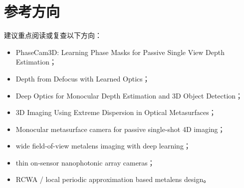 \documentclass[11pt,a4paper,fontset=none]{ctexart}
\begin{document}
\section*{参考方向}

建议重点阅读或复查以下方向：
\begin{itemize}
  \item PhaseCam3D: Learning Phase Masks for Passive Single View Depth Estimation；
  \item Depth from Defocus with Learned Optics；
  \item Deep Optics for Monocular Depth Estimation and 3D Object Detection；
  \item 3D Imaging Using Extreme Dispersion in Optical Metasurfaces；
  \item Monocular metasurface camera for passive single-shot 4D imaging；
  \item wide field-of-view metalens imaging with deep learning；
  \item thin on-sensor nanophotonic array cameras；
  \item RCWA / local periodic approximation based metalens design。
\end{itemize}
\end{document}

